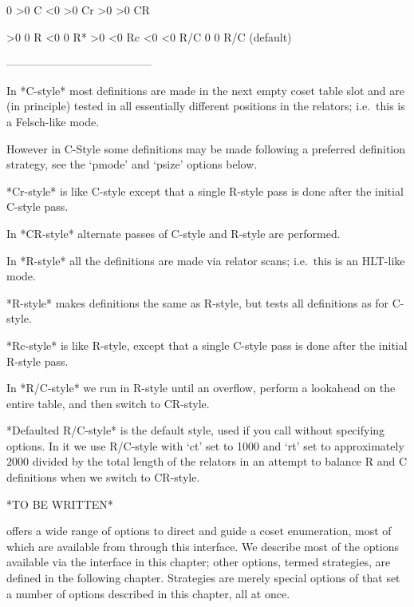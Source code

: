    0           >0         C
  <0           >0         Cr
  >0           >0         CR

  >0            0         R
  <0            0         R*
  >0           <0         Rc
  <0           <0         R/C
   0            0         R/C (default)

---------------------------------------
\endtt

In *C-style*  most definitions are made in the  next empty coset table
slot  and  are (in  principle)  tested  in  all essentially  different
positions in the relators; i.e.~this is a Felsch-like mode.

However in C-Style some  definitions may be made following a preferred
definition strategy, see the `pmode' and `psize' options below.

*Cr-style* is like  C-style except that a single R-style  pass is done
after the initial C-style pass.

In *CR-style* alternate passes of C-style and R-style are performed.

In *R-style*  all   the  definitions  are   made  via  relator  scans; 
i.e.~this is an HLT-like mode.

*R\*-style*  makes  definitions the  same as  R-style,  but  tests all
definitions as for C-style.

*Rc-style* is like R-style, except  that a single C-style pass is done
after the initial R-style pass.

In  *R/C-style*  we  run  in  R-style  until  an  overflow, perform  a
lookahead on the entire table, and then switch to CR-style.

*Defaulted R/C-style*  is the default  style, used if  you call {\ACE}
without specifying  options. In it we  use R/C-style with  `ct' set to
1000 and `rt' set to  approximately $2000$ divided by the total length
of the relators  in an attempt to balance R and  C definitions when we
switch to CR-style.


*TO BE WRITTEN*



{\ACE} offers a wide range of options to  direct  and  guide  a  coset
enumeration, most of which are  available  from  {\GAP}  through  this
interface. We describe most of the options available via the interface
in this chapter; other options, termed strategies, are defined in  the
following chapter. Strategies are merely  special  options  of  {\ACE}
that set a number of options described in this chapter, all at once.

